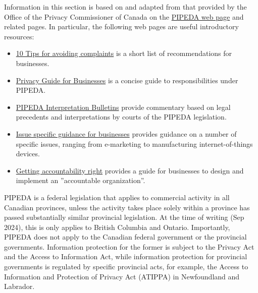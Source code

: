 \begin{resourcebox}

Information in this section is based on and adapted from that provided by the Office of the Privacy Commissioner of Canada on the \href{https://www.priv.gc.ca/en/privacy-topics/privacy-laws-in-canada/the-personal-information-protection-and-electronic-documents-act-pipeda/p_principle/}{PIPEDA web page} and related pages. In particular, the following web pages are useful introductory resources:
\begin{itemize}
   \item \href{https://www.priv.gc.ca/en/privacy-topics/privacy-laws-in-canada/the-personal-information-protection-and-electronic-documents-act-pipeda/pipeda-compliance-help/02_05_d_55_tips/}{10 Tips for avoiding complaints} is a short list of recommendations for businesses. 
   \item \href{https://www.priv.gc.ca/media/2038/guide_org_e.pdf}{Privacy Guide for Businesses} is a concise guide to responsibilities under PIPEDA.
   \item \href{https://www.priv.gc.ca/en/privacy-topics/privacy-laws-in-canada/the-personal-information-protection-and-electronic-documents-act-pipeda/pipeda-compliance-help/pipeda-interpretation-bulletins/}{PIPEDA Interpretation Bulletins} provide commentary based on legal precedents and interpretations by courts of the PIPEDA legislation.
   \item \href{https://www.priv.gc.ca/en/privacy-topics/privacy-laws-in-canada/the-personal-information-protection-and-electronic-documents-act-pipeda/pipeda-compliance-help/issue-specific-guidance-for-businesses/}{Issue specific guidance for businesses} provides guidance on a number of specific issues, ranging from e-marketing to manufacturing internet-of-things devices.
   \item \href{https://www.priv.gc.ca/en/privacy-topics/privacy-laws-in-canada/the-personal-information-protection-and-electronic-documents-act-pipeda/pipeda-compliance-help/pipeda-compliance-and-training-tools/gl_acc_201204/}{Getting accountability right} provides a guide for businesses to design and implement an ''accountable organization''. 
\end{itemize}
\end{resourcebox}

PIPEDA is a federal legislation that applies to commercial activity in all Canadian provinces, unless the activity takes place solely within a province has passed substantially similar provincial legislation. At the time of writing (Sep 2024), this is only applies to British Columbia and Ontario. Importantly, PIPEDA does not apply to the Canadian federal government or the provincial governments. Information protection for the former is subject to the Privacy Act and the Access to Information Act, while information protection for provincial governments is regulated by specific provincial acts, for example, the Access to Information and Protection of Privacy Act (ATIPPA) in Newfoundland and Labrador.

